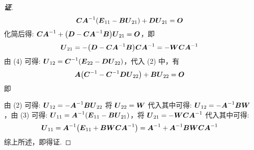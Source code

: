 \begin{proof}[{\songti \textbf{证}}]
    $$\vb*{CA}^{-1}(\vb*{E}_{11}-\vb*{BU}_{21})+\vb*{DU}_{21}=\vb*{O}$$
    化简后得: $\vb*{CA}^{-1}+\qty(\vb*{D}-\vb*{CA}^{-1}\vb*{B})\vb*{U}_{21}=\vb*{O}$，即
    $$\vb*{U}_{21}=-\qty(\vb*{D}-\vb*{CA}^{-1}\vb*{B})\vb*{CA}^{-1}=-\vb*{WCA}^{-1}$$
    由 (4) 可得: $\vb*{U}_{12}=\vb*{C}^{-1}(\vb*{E}_{22}-\vb*{DU}_{22})$，代入 (2) 中，有
    $$\vb*{A}\qty(\vb*{C}^{-1}-\vb*{C}^{-1}\vb*{DU}_{22})+\vb*{BU}_{22}=\vb*{O}$$
    即
    由 (2) 可得: $\vb*{U}_{12}=-\vb*{A}^{-1}\vb*{BU}_{22}$ 将 $\vb*{U}_{22}=\vb*{W}$ 代入其中可得: $\vb*{U}_{12}=-\vb*{A}^{-1}\vb*{BW}$，由 (3) 可得: 
    $\vb*{U}_{11}=\vb*{A}^{-1}(\vb*{E}_{11}-\vb*{BU}_{21})$，将 $\vb*{U}_{21}=-\vb*{WCA}^{-1}$ 代入其中可得:
    $$\vb*{U}_{11}=\vb*{A}^{-1}\qty(\vb*{E}_{11}+\vb*{BWCA}^{-1})=\vb*{A}^{-1}+\vb*{A}^{-1}\vb*{BWCA}^{-1}$$
    综上所述，即得证.
\end{proof}

